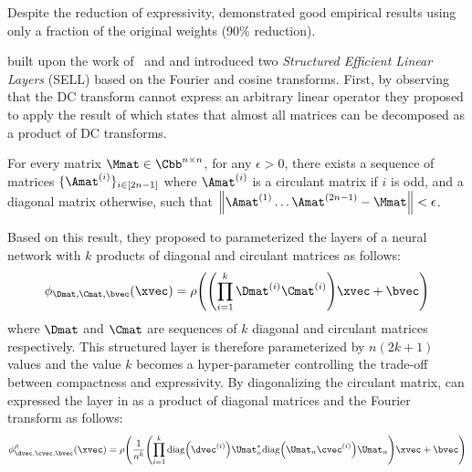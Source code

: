 Despite the reduction of expressivity, \citet{cheng2015exploration} demonstrated good empirical results using only a fraction of the original weights (90\% reduction). 


\citet{moczulski2016acdc} built upon the work of~\citet{cheng2015exploration} and \citet{huhtanen2015factoring} and introduced two \emph{Structured Efficient Linear Layers} (SELL) based on the Fourier and cosine transforms.
First, by observing that the DC transform cannot express an arbitrary linear operator they proposed to apply the result of \citet{huhtanen2015factoring} which states that almost all matrices can be decomposed as a product of DC transforms.
\begin{theorem} \label{theorem:ch3-huhtanen}
  For every matrix $\Mmat \in \Cnn$, for any $\epsilon > 0$, there exists a sequence of matrices $\{ \Amat^{(i)} \}_{i \in [2n-1]}$ where $\Amat^{(i)}$ is a circulant matrix if $i$ is odd, and a diagonal matrix otherwise, such that $\norm{\Amat^{(1)} \ldots \Amat^{(2n-1)} - \Mmat} < \epsilon$.
\end{theorem}
\noindent
Based on this result, they proposed to parameterized the layers of a neural network with $k$ products of diagonal and circulant matrices as follows:
\begin{equation} \label{equation:acdc_layer}
  \layer_{\Dmat, \Cmat, \bvec} (\xvec) = \act \left( \left(\prod_{i = 1}^{k} \Dmat^{(i)} \Cmat^{(i)} \right) \xvec + \bvec \right)
\end{equation}
where $\Dmat$ and $\Cmat$ are sequences of $k$ diagonal and circulant matrices respectively.
This structured layer is therefore parameterized by $n(2k+1)$ values and the value $k$ becomes a hyper-parameter controlling the trade-off between compactness and expressivity. 
By diagonalizing the circulant matrix, \citet{moczulski2016acdc} can expressed the layer in  as a product of diagonal matrices and the Fourier transform as follows:
\begin{equation} \label{equation:ch3-laye_acdc}
  \layer^\act_{\dvec, \cvec, \bvec} (\xvec) = \act \left(\frac{1}{n^k} \left(\prod_{i = 1}^{k} \diag\left(\dvec^{(i)}\right) \Umat_n^* \diag\left(\Umat_n \cvec^{(i)}\right) \Umat_n \right) \xvec + \bvec \right)
\end{equation}
